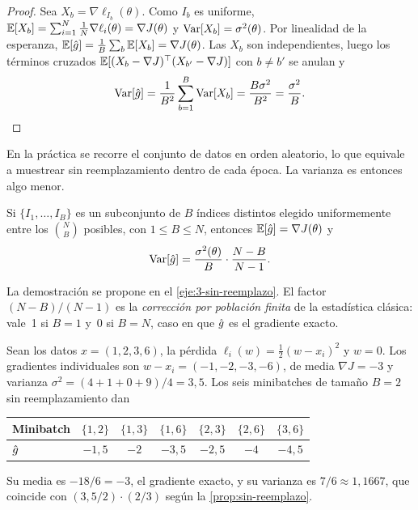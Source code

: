 \begin{proof}
Sea $X_b=\nabla\ell_{I_b}(\theta)$. Como $I_b$ es uniforme, $\mathbb{E}[X_b]=\sum_{i=1}^{N}\frac1N\nabla\ell_i(\theta)=\nabla J(\theta)$ y $\operatorname{Var}[X_b]=\sigma^{2}(\theta)$. Por linealidad de la esperanza, $\mathbb{E}[\hat g]=\frac1B\sum_b\mathbb{E}[X_b]=\nabla J(\theta)$. Las $X_b$ son independientes, luego los términos cruzados $\mathbb{E}[(X_b-\nabla J)^{\top}(X_{b'}-\nabla J)]$ con $b\ne b'$ se anulan y
\[
\operatorname{Var}[\hat g]=\frac{1}{B^{2}}\sum_{b=1}^{B}\operatorname{Var}[X_b]=\frac{B\sigma^{2}}{B^{2}}=\frac{\sigma^{2}}{B}.\qedhere
\]
\end{proof}

En la práctica se recorre el conjunto de datos en orden aleatorio, lo que equivale a muestrear sin reemplazamiento dentro de cada época. La varianza es entonces algo menor.

\begin{proposicion}\label{prop:sin-reemplazo}
Si $\{I_1,\dots,I_B\}$ es un subconjunto de $B$ índices distintos elegido uniformemente entre los $\binom{N}{B}$ posibles, con $1\le B\le N$, entonces $\mathbb{E}[\hat g]=\nabla J(\theta)$ y
\[
\operatorname{Var}[\hat g]=\frac{\sigma^{2}(\theta)}{B}\cdot\frac{N-B}{N-1}.
\]
\end{proposicion}

La demostración se propone en el \cref{eje:3-sin-reemplazo}. El factor $(N-B)/(N-1)$ es la \emph{corrección por población finita} de la estadística clásica: vale~1 si $B=1$ y~0 si $B=N$, caso en que $\hat g$ es el gradiente exacto.

\begin{ejemplo}\label{ej:minibatch}
Sean los datos $x=(1,2,3,6)$, la pérdida $\ell_i(w)=\tfrac12(w-x_i)^{2}$ y $w=0$. Los gradientes individuales son $w-x_i=(-1,-2,-3,-6)$, de media $\nabla J=-3$ y varianza $\sigma^{2}=(4+1+0+9)/4=3{,}5$. Los seis minibatches de tamaño $B=2$ sin reemplazamiento dan
\begin{center}\small
\begin{tabular}{@{}lcccccc@{}}
\toprule
Minibatch & $\{1,2\}$ & $\{1,3\}$ & $\{1,6\}$ & $\{2,3\}$ & $\{2,6\}$ & $\{3,6\}$ \\
\midrule
$\hat g$ & $-1{,}5$ & $-2$ & $-3{,}5$ & $-2{,}5$ & $-4$ & $-4{,}5$ \\
\bottomrule
\end{tabular}
\end{center}
Su media es $-18/6=-3$, el gradiente exacto, y su varianza es $7/6\approx 1{,}1667$, que coincide con $(3{,}5/2)\cdot(2/3)$ según la \cref{prop:sin-reemplazo}.
\end{ejemplo}

